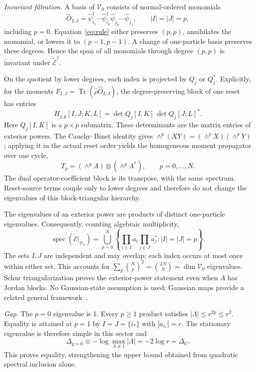 \documentclass[aps,prb,twocolumn,10pt,nofootinbib,superscriptaddress]{revtex4-2}
\newcommand{\Tr}{\operatorname{Tr}}
\newcommand{\spec}{\operatorname{spec}}
\newcommand{\E}{\widetilde{\mathcal E}}
\begin{document}
\textit{Invariant filtration.} A basis of $\mathcal V_0$ consists of
normal-ordered monomials
\begin{equation}
 \hat O_{I,J}=\hat\psi_{i_1}^\dagger\cdots\hat\psi_{i_p}^\dagger
 \hat\psi_{j_p}\cdots\hat\psi_{j_1},\qquad |I|=|J|=p,
 \label{eq:monomials}
\end{equation}
including $p=0$. Equation~\eqref{eq:rule} either preserves $(p,p)$,
annihilates the monomial, or lowers it to $(p-1,p-1)$. A change of
one-particle basis preserves these degrees. Hence the span of all
monomials through degree $(p,p)$ is invariant under $\E^\dagger$.

On the quotient by lower degrees, each index is projected by $Q_j$ or
$Q_j^*$. Explicitly, for the moments
$F_{I,J}=\Tr(\hat\rho\hat O_{I,J})$, the degree-preserving block of one
reset has entries
\begin{equation}
 H_{j,p}[I,J;K,L]
 =\det Q_j[I,K]\,\det Q_j[J,L]^*. \label{eq:minors}
\end{equation}
Here $Q_j[I,K]$ is a $p\times p$ submatrix. These determinants are the
matrix entries of exterior powers. The Cauchy--Binet identity gives
$\wedge^p(XY)=(\wedge^p X)(\wedge^p Y)$; applying it in the actual reset
order yields the homogeneous moment propagator over one cycle,
\begin{equation}
 T_p=(\wedge^p A)\otimes(\wedge^p A^*),\qquad
 p=0,\ldots,N. \label{eq:blocks}
\end{equation}
The dual operator-coefficient block is its transpose, with the same
spectrum. Reset-source terms couple only to lower degrees and therefore
do not change the eigenvalues of this block-triangular hierarchy.

The eigenvalues of an exterior power are products of distinct
one-particle eigenvalues. Consequently, counting algebraic multiplicity,
\begin{equation}
 \spec(\E|_{\mathcal V_0})=
 \bigcup_{p=0}^{N}
 \left\{\prod_{i\in I}a_i\prod_{j\in J}a_j^*:
 |I|=|J|=p\right\}. \label{eq:spectrum}
\end{equation}
The sets $I,J$ are independent and may overlap; each index occurs at
most once within either set. This accounts for
$\sum_p\binom Np^2=\binom{2N}{N}=\dim\mathcal V_0$ eigenvalues.
Schur triangularization proves the exterior-power statement even when
$A$ has Jordan blocks. No Gaussian-state assumption is used; Gaussian
maps provide a related general framework~\cite{Bravyi}.

\textit{Gap.} The $p=0$ eigenvalue is 1. Every $p\geq1$ product satisfies
$|\Lambda|\leq r^{2p}\leq r^2$. Equality is attained at $p=1$ by
$I=J=\{i_*\}$ with $|a_{i_*}|=r$. The stationary eigenvalue is therefore
simple in this sector and
\begin{equation}
 \boxed{\Delta_{q=0}\equiv-\log
 \max_{\Lambda\ne1}|\Lambda|=-2\log r=\Delta_C.}
 \label{eq:gap}
\end{equation}
This proves equality, strengthening the upper bound obtained from
quadratic spectral inclusion alone.
\end{document}
